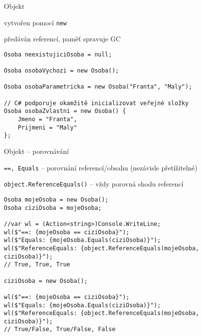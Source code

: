 



\begin{frame}[fragile]
\vfill
\begin{bitemize}{Objekt}
\item vytvořen pomocí \lstinline|new|
\item předáván referencí, paměť spravuje GC
\end{bitemize}
\vfill
\begin{yesblock}
\begin{lstlisting}
Osoba neexistujiciOsoba = null;

Osoba osobaVychozi = new Osoba();

Osoba osobaParametricka = new Osoba("Franta", "Maly");

// C# podporuje okamžitě inicializovat veřejné složky
Osoba osobaZvlastni = new Osoba() {
	Jmeno = "Franta",
	Prijmeni = "Maly"
};
\end{lstlisting}
\end{yesblock}
\vfill
\end{frame}



\begin{frame}[fragile]
\vfill
\begin{bitemize}{Objekt -- porovnávání}
\item \lstinline|==, Equals| -- porovnání referencí/obsahu (nezávisle přetížitelné)
\item \lstinline|object.ReferenceEquals()| -- vždy porovná shodu referencí
\end{bitemize}
\vfill
\begin{yesblock}
\begin{lstlisting}[basicstyle=\small]
Osoba mojeOsoba = new Osoba();
Osoba ciziOsoba = mojeOsoba;

//var wl = (Action<string>)Console.WriteLine;
wl($"==: {mojeOsoba == ciziOsoba}");
wl($"Equals: {mojeOsoba.Equals(ciziOsoba)}");
wl($"ReferenceEquals: {object.ReferenceEquals(mojeOsoba, ciziOsoba)}");
// True, True, True

ciziOsoba = new Osoba();

wl($"==: {mojeOsoba == ciziOsoba}");
wl($"Equals: {mojeOsoba.Equals(ciziOsoba)}");
wl($"ReferenceEquals: {object.ReferenceEquals(mojeOsoba, ciziOsoba)}");
// True/False, True/False, False
\end{lstlisting}
\end{yesblock}
\vfill
\end{frame}




